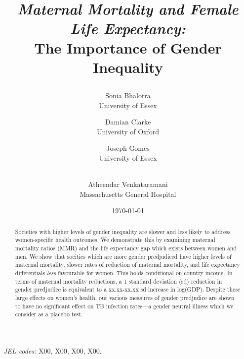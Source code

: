 \documentclass[11pt]{article}
\title{{\bf\Large{\textsl{Maternal Mortality and Female Life Expectancy: }\\ 
\large\normalsize The Importance of Gender Inequality}} \footnotemark[7] 
\author{Sonia Bhalotra\\ \normalsize{University of Essex}\footnotemark[1] 
\and Damian Clarke\\ \normalsize{University of Oxford}\footnotemark[2]\\ 
\and Joseph Gomes\\ \normalsize{University of Essex}\footnotemark[3]\\\\ 
\and Atheendar Venkataramani\\ \normalsize{Massachusetts General Hospital}\footnotemark[4]\\}}
\date{\today}
\renewcommand{\thefootnote}{\fnsymbol{footnote}}
\begin{document}
\thispagestyle{empty}
\maketitle
\renewcommand{\thefootnote}{\arabic{footnote}} \setcounter{footnote}{0} 



\begin{abstract}
Societies with higher levels of gender inequality are slower and less likely to
address women-specific health outcomes.  We demonstrate this by examining 
maternal mortality ratios (MMR) and the life expectancy gap which exists between
women and men.  We show that socities which are more gender predjudiced 
have higher levels of maternal mortality, slower rates of reduction of maternal 
mortality, and life expectancy differentials \emph{less} favourable for women.
This holds conditional on country income.  In terms of maternal mortality 
reductions, a 1 standard deviation (sd) reduction in gender predjudice is 
equivalent to a xx.xx-xx.xx sd increase in log(GDP).  Despite these large effects
on women's health, our various measures of gender predjudice are shown to have 
no significant effect on TB infection rates---a gender neutral illness which we 
consider as a placebo test.
\end{abstract}

\emph{JEL codes:} X00, X00, X00, X00.
\end{document}
